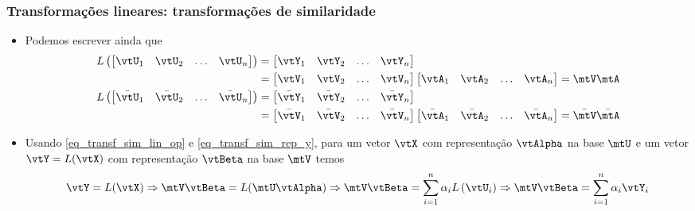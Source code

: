 \begin{frame}
  \frametitle{Transformações lineares: transformações de similaridade}
  \begin{itemize}\footnotesize
    \item Podemos escrever ainda que
    \begin{subequations}\label{eq_transf_sim_rep_y}
      \begin{align}
        L\left(\left[\begin{matrix} \vtU_1 & \vtU_2 & \ldots & \vtU_n\end{matrix}\right]\right) &= \left[\begin{matrix} \vtY_1 & \vtY_2 & \ldots & \vtY_n\end{matrix}\right] \nonumber \\
        &= \left[\begin{matrix} \vtV_1 & \vtV_2 & \ldots & \vtV_n\end{matrix}\right]\left[\begin{matrix} \vtA_1 & \vtA_2 & \ldots & \vtA_n\end{matrix}\right] = \mtV\mtA \label{eq_transf_sim_rep_y_a}\\
        L\left(\left[\begin{matrix} \bar{\vtU}_1 & \bar{\vtU}_2 & \ldots & \bar{\vtU}_n\end{matrix}\right]\right) &= \left[\begin{matrix} \bar{\vtY}_1 & \bar{\vtY}_2 & \ldots & \bar{\vtY}_n\end{matrix}\right]  \nonumber \\
        &= \left[\begin{matrix} \bar{\vtV}_1 & \bar{\vtV}_2 & \ldots & \bar{\vtV}_n\end{matrix}\right]\left[\begin{matrix} \bar{\vtA}_1 & \bar{\vtA}_2 & \ldots & \bar{\vtA}_n\end{matrix}\right] = \bar{\mtV}\bar{\mtA} \label{eq_transf_sim_rep_y_b}
      \end{align}
    \end{subequations}
    \item Usando \eqref{eq_transf_sim_lin_op} e \eqref{eq_transf_sim_rep_y}, para um vetor $\vtX$ com representação $\vtAlpha$ na base $\mtU$ e um vetor $\vtY = L(\vtX)$ com representação $\vtBeta$ na base $\mtV$ temos
    \begin{equation}\label{eq_beta_rep}
      \begin{split}
        \vtY &= L(\vtX) \Rightarrow \mtV\vtBeta = L(\mtU\vtAlpha) \Rightarrow \mtV\vtBeta = \sum\limits_{i=1}^n \alpha_iL\left(\vtU_i\right) \Rightarrow \mtV\vtBeta = \sum\limits_{i=1}^n \alpha_i\vtY_i \\

\end{split}
\end{equation}
\end{itemize}
\end{frame}
